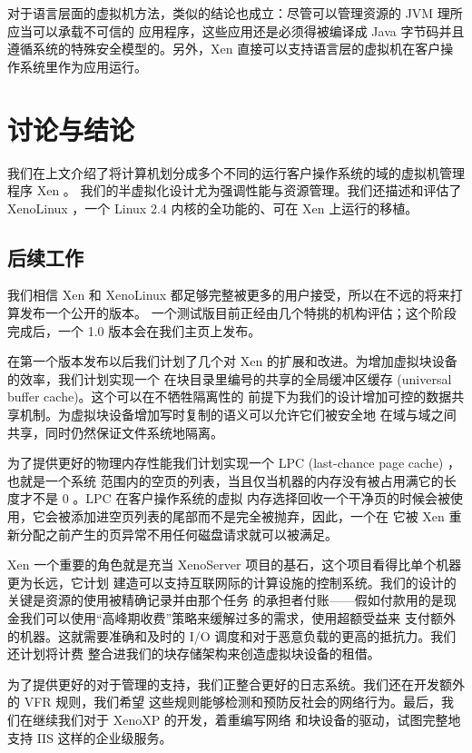 对于语言层面的虚拟机方法，类似的结论也成立：尽管可以管理资源的 JVM 理所应当可以承载不可信的
应用程序，这些应用还是必须得被编译成 Java 字节码并且遵循系统的特殊安全模型的。另外，Xen
直接可以支持语言层的虚拟机在客户操作系统里作为应用运行。

\section{讨论与结论}

我们在上文介绍了将计算机划分成多个不同的运行客户操作系统的域的虚拟机管理程序 Xen 。
我们的半虚拟化设计尤为强调性能与资源管理。我们还描述和评估了 XenoLinux ，一个 Linux 2.4
内核的全功能的、可在 Xen 上运行的移植。

\subsection{后续工作}

我们相信 Xen 和 XenoLinux 都足够完整被更多的用户接受，所以在不远的将来打算发布一个公开的版本。
一个测试版目前正经由几个特挑的机构评估；这个阶段完成后，一个 1.0 版本会在我们主页上发布。

在第一个版本发布以后我们计划了几个对 Xen 的扩展和改进。为增加虚拟块设备的效率，我们计划实现一个
在块目录里编号的共享的全局缓冲区缓存 (universal buffer cache)。这个可以在不牺牲隔离性的
前提下为我们的设计增加可控的数据共享机制。为虚拟块设备增加写时复制的语义可以允许它们被安全地
在域与域之间共享，同时仍然保证文件系统地隔离。

为了提供更好的物理内存性能我们计划实现一个 LPC (last-chance page cache) ，也就是一个系统
范围内的空页的列表，当且仅当机器的内存没有被占用满它的长度才不是 0 。LPC 在客户操作系统的虚拟
内存选择回收一个干净页的时候会被使用，它会被添加进空页列表的尾部而不是完全被抛弃，因此，一个在
它被 Xen 重新分配之前产生的页异常不用任何磁盘请求就可以被满足。

Xen 一个重要的角色就是充当 XenoServer 项目的基石，这个项目看得比单个机器更为长远，它计划
建造可以支持互联网际的计算设施的控制系统。我们的设计的关键是资源的使用被精确记录并由那个任务
的承担者付账——假如付款用的是现金我们可以使用“高峰期收费”策略来缓解过多的需求，使用超额受益来
支付额外的机器。这就需要准确和及时的 I/O 调度和对于恶意负载的更高的抵抗力。我们还计划将计费
整合进我们的块存储架构来创造虚拟块设备的租借。

为了提供更好的对于管理的支持，我们正整合更好的日志系统。我们还在开发额外的 VFR 规则，我们希望
这些规则能够检测和预防反社会的网络行为。最后，我们在继续我们对于 XenoXP 的开发，着重编写网络
和块设备的驱动，试图完整地支持 IIS 这样的企业级服务。

